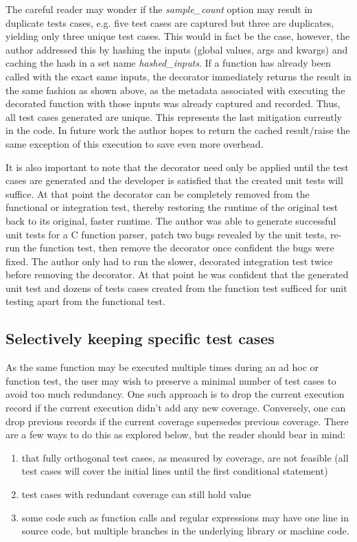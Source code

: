 The careful reader may wonder if the \textit{sample\_count} option may result in 
duplicate tests cases, e.g. five test cases are captured but three are duplicates, 
yielding only three unique test cases.  This would in fact be the case, however, the author 
addressed this by hashing the inputs (global values, args and kwargs) and 
caching the hash in a set name \textit{hashed\_inputs}.  If a function has
already been called with the exact same inputs, the decorator immediately returns
the result in the same fashion as shown above, as the metadata associated with
 executing the decorated function
with those inputs was already captured and recorded.  Thus, all test cases 
generated are unique.  This represents the last mitigation
currently in the code.  In future work the author hopes to return the cached 
result/raise the same exception of this execution to save even more overhead.  

It is also important to note that the decorator need only be applied until the 
test cases are generated and the developer is satisfied that the created unit
tests will suffice.  At that point the decorator can be completely removed
from the functional or integration test, thereby restoring the runtime of
the original test back to its original, faster runtime.  The author 
was able to generate successful unit tests for a C function parser, patch two
bugs revealed by the unit tests, re-run the function test, then remove 
the decorator once confident the bugs were fixed.  The author only had to run 
the slower, decorated integration test twice before removing the decorator.
At that point he was confident that the generated unit test and dozens of 
tests cases created from the function test sufficed for unit testing apart 
from the functional test.

\subsection{Selectively keeping specific test cases}\label{sec:tuning-1}
As the same function may be executed multiple times during an ad hoc or 
function test, the user may wish to preserve a minimal number of test cases to 
avoid too much redundancy.  One such approach is to drop the current execution
record if the current execution didn’t add any new coverage.  
Conversely, one can drop previous records if the current coverage supersedes
previous coverage.
There are a few ways to do this as explored below, but the reader should bear in mind:

\begin{enumerate}
  \item that fully orthogonal test cases, as measured by coverage, are not feasible 
  (all test cases will cover the initial lines until the first conditional statement) 
  \item test cases with redundant coverage can still hold value
  \item some code such as function calls and regular expressions may have one 
  line in source code, but multiple branches in the underlying library or machine code.
\end{enumerate}

